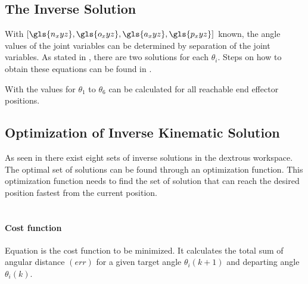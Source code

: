 \subsection{The Inverse Solution} \label{InverseSol}
With $[\gls{n_xyz},\gls{o_xyz},\gls{a_xyz},\gls{p_xyz}]$ known, the angle values of the joint variables can be determined by separation of the joint variables. 
As stated in , there are two solutions for each $\theta_i$. Steps on how to obtain these equations can be found in .
\medskip




With  %
the values for $\theta_1$ to %
$\theta_6$ can be calculated for all reachable end effector positions.\\

\medskip


\subsection{Optimization of Inverse Kinematic Solution}

As seen in  there exist eight sets of inverse solutions in the dextrous workspace.
The optimal set of solutions can be found through an optimization function. 
This optimization function needs to find the set of solution that can reach the desired position fastest from the current position.\\
\\
\paragraph{Cost function}
Equation  is the cost function to be minimized. It calculates the total sum of angular distance $(err)$ for a given target angle $\theta_i (k+1)$ and departing angle $\theta_i(k)$.

